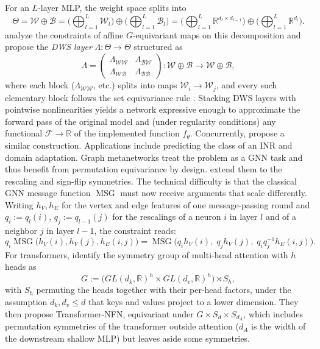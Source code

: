 \documentclass[mathematics,review,submit,moreauthors]{Definitions/mdpi}
\begin{document}
For an $L$-layer MLP, the weight space splits into
\begin{equation*}
    \Theta=\mathcal{W}\oplus\mathcal{B}=\Big(\bigoplus_{l=1}^{L}\mathcal{W}_l\Big)\oplus\Big(\bigoplus_{l=1}^{L}\mathcal{B}_l\Big)=\Big(\bigoplus_{l=1}^{L}\mathbb{R}^{d_l\times d_{l-1}}\Big)\oplus\Big(\bigoplus_{l=1}^{L}\mathbb{R}^{d_l}\Big).
\end{equation*}
\citet{navon2023p4icml} analyze the constraints of affine $G$-equivariant maps on this decomposition and propose the \emph{DWS layer} $\Lambda:\Theta\to\Theta$ structured as
\begin{equation*}
    \Lambda=\begin{pmatrix}\Lambda_{\mathcal{W}\mathcal{W}} & \Lambda_{\mathcal{B}\mathcal{W}}\\[2pt] \Lambda_{\mathcal{W}\mathcal{B}} & \Lambda_{\mathcal{B}\mathcal{B}}\end{pmatrix}:\mathcal{W}\oplus\mathcal{B}\longrightarrow\mathcal{W}\oplus\mathcal{B},
\end{equation*}
where each block ($\Lambda_{\mathcal{W}\mathcal{W}}$, etc.) splits into maps $\mathcal{W}_i\to\mathcal{W}_j$, and every such elementary block follows the set equivariance rule \citep{zaheer2018}.
Stacking DWS layers with pointwise nonlinearities yields a network expressive enough to approximate the forward pass of the original model and (under regularity conditions) any functional $\mathcal{F}\to \mathbb R$ of the implemented function $f_\theta$.
Concurrently, \citet{zhou2023} propose a similar construction.
Applications include predicting the class of an INR and domain adaptation.
Graph metanetworks \citep{lim2024iclr,kofinas2024iclr} treat the problem as a GNN task and thus benefit from permutation equivariance by design. 
\citet{kalogeropoulos2024} extend them to the rescaling and sign-flip symmetries.
The technical difficulty is that the classical GNN message function $\operatorname{MSG}$ must now receive arguments that scale differently.
Writing $h_V,h_E$ for the vertex and edge features of one message-passing round and $q_i:=q_l(i)$, $q_j:=q_{l-1}(j)$ for the rescalings of a neuron $i$ in layer $l$ and of a neighbor $j$ in layer $l-1$, the constraint reads:
\begin{equation*}
    q_i\operatorname{MSG}\big(h_V(i),h_V(j),h_E(i,j)\big)=\operatorname{MSG}\big(q_ih_V(i),\;q_jh_V(j),\;q_iq_j^{-1}h_E(i,j)\big).
\end{equation*}
For transformers, \citet{tran2025iclr} identify the symmetry group of multi-head attention with $h$ heads as
\begin{equation*}
    G:=\big(GL(d_k,\mathbb{R})^{h}\times GL(d_v,\mathbb{R})^{h}\big)\rtimes S_h,
\end{equation*}
with $S_h$ permuting the heads together with their per-head factors, under the assumption $d_k,d_v\le d$ that keys and values project to a lower dimension.
They then propose Transformer-NFN, equivariant under $G\times S_d\times S_{d_A}$, which includes permutation symmetries of the transformer outside attention ($d_A$ is the width of the downstream shallow MLP) but leaves aside some symmetries.
\end{document}
